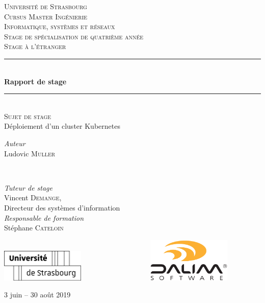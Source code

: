 \documentclass[]{article}
\begin{document}
\begin{titlepage}
	\newcommand{\HRule}{\rule{\linewidth}{0.5mm}}
	
	\center
	\textsc{\LARGE Université de Strasbourg}\\[1.5cm]
	\textsc{\Large Cursus Master Ingénierie \\ Informatique, systèmes et réseaux}\\[0.5cm]
	\textsc{\large Stage de spécialisation de quatrième année \\ Stage à l'étranger}\\[0.5cm]
	
	\HRule\\[0.4cm]
	{\huge\bfseries Rapport de stage}\\[0.4cm]
	\HRule\\[1.5cm]

	\textsc{\large Sujet de stage}\\[0.5cm]
	Déploiement d'un cluster Kubernetes
	\vfill

	\begin{minipage}{0.4\textwidth}
		\begin{flushleft}
			\large
			\textit{Auteur}\\
			Ludovic \textsc{Muller}
		\end{flushleft}
	\end{minipage}
	~
	\begin{minipage}{0.4\textwidth}
		\begin{flushright}
			\large
			\textit{Tuteur de stage}\\
			Vincent \textsc{Demange},\\
      Directeur des systèmes d'information
			\vfill
			\textit{\\Responsable de formation}\\
			Stéphane \textsc{Cateloin}\\
		\end{flushright}
	\end{minipage}
    
	\vfill\vfill
	\includegraphics[width=0.3\textwidth]{../images/logos/unistra.png}
	\includegraphics[width=0.3\textwidth]{../images/logos/dalim.png}
	\vfill
		
	\vfill\vfill
	
	3 juin – 30 août 2019
	
\end{titlepage}
\end{document}

